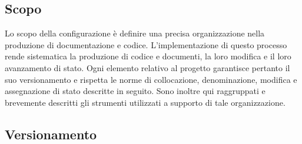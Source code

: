 \subsection{Scopo}\label{ProcessiDiSupportoGestioneDellaConfigurazioneScopo}
Lo scopo della configurazione è definire una precisa organizzazione nella produzione di documentazione e codice.
L'implementazione di questo processo rende sistematica la produzione di codice e documenti, la loro modifica e il loro avanzamento di stato.
Ogni elemento relativo al progetto garantisce pertanto il suo versionamento e rispetta le norme di collocazione, denominazione, modifica e assegnazione di stato descritte in seguito.
Sono inoltre qui raggruppati e brevemente descritti gli strumenti utilizzati a supporto di tale organizzazione.
\subsection{Versionamento}\label{ProcessiDiSupportoGestioneDellaConfigurazioneVersionamento}
